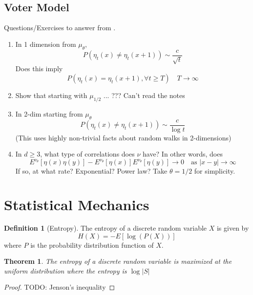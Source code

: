 \documentclass{article}
\theoremstyle{plain}
\newtheorem{theorem}{Theorem}[section]
\theoremstyle{definition}
\newtheorem{defn}{Definition}[section]
\theoremstyle{remark}
\begin{document}
\subsection{Voter Model}

Questions/Exercises to answer from \cite{steif1991}.
\begin{enumerate}
    \item In 1 dimension from $\mu_\theta$,
    $$
    P(\eta_t(x) \not = \eta_t(x + 1)) \sim \frac{c}{\sqrt{t}}
    $$
    Does this imply
    $$
    P(\eta_t(x) = \eta_t(x + 1), \forall t \geq T) \quad T \to \infty
    $$
    \item Show that starting with $\mu_{1/2}$ ...  ??? Can't read the notes
    \item In 2-dim starting from $\mu_\theta$
        $$
    P(\eta_t(x) \not = \eta_t(x + 1)) \sim \frac{c}{\log{t}}
    $$
    (This uses highly non-trivial facts about random walks in 2-dimensions)
    \item In $d \geq 3$, what type of correlations does $\nu$ have?
    In other words, does
    $$
    E^{\nu_\theta}[\eta(x) \eta(y)] - E^{\nu_\theta}[\eta(x)] E^{\nu_\theta}[\eta(y)] \longrightarrow 0 \quad \text{as } |x - y| \to \infty
    $$
    If so, at what rate? Exponential? Power law? Take $\theta = 1/2$ for simplicity.
\end{enumerate}

\section{Statistical Mechanics}

\begin{defn}[Entropy]
    The entropy of a discrete random variable $X$ is given by
    $$
    H(X) = -E[\log(P(X))]
    $$
    where $P$ is the probability distribution function of $X$.
\end{defn}

\begin{theorem}
The entropy of a discrete random variable is maximized at the uniform distribution where the entropy is $\log |S|$
\end{theorem}

\begin{proof}
TODO: Jenson's inequality
\end{proof}



\end{document}

